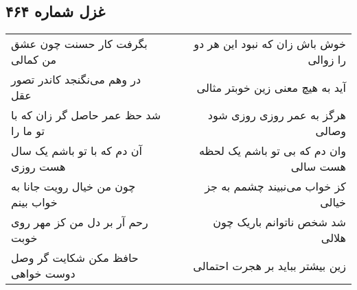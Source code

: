 \begin{center}
\section*{غزل شماره ۴۶۴}
\label{sec:sh464}
\begin{longtable}{l p{0.5cm} r}
بگرفت کار حسنت چون عشق من کمالی
&&
خوش باش زان که نبود این هر دو را زوالی
\\
در وهم می‌نگنجد کاندر تصور عقل
&&
آید به هیچ معنی زین خوبتر مثالی
\\
شد حظ عمر حاصل گر زان که با تو ما را
&&
هرگز به عمر روزی روزی شود وصالی
\\
آن دم که با تو باشم یک سال هست روزی
&&
وان دم که بی تو باشم یک لحظه هست سالی
\\
چون من خیال رویت جانا به خواب بینم
&&
کز خواب می‌نبیند چشمم به جز خیالی
\\
رحم آر بر دل من کز مهر روی خوبت
&&
شد شخص ناتوانم باریک چون هلالی
\\
حافظ مکن شکایت گر وصل دوست خواهی
&&
زین بیشتر بباید بر هجرت احتمالی
\\
\end{longtable}
\end{center}
